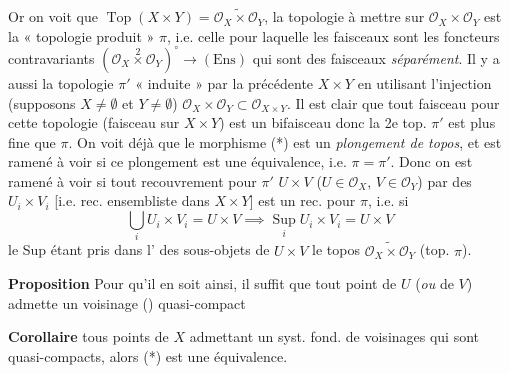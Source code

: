 \documentclass[11pt,a4paper]{article}
\begin{document}

Or on voit que $\operatorname{Top}(X \times Y) = \widetilde{\mathcal{O}_{X}
\times \mathcal{O}_{Y}}$,  la topologie à mettre sur
$\mathcal{O}_{X} \times \mathcal{O}_{Y}$ est la « topologie produit » $\pi$,
i.e. celle pour laquelle les faisceaux sont les foncteurs contravariants
$(\mathcal{O}_{X} \overset{2}{\times} \mathcal{O}_{Y})^{\circ} \to
(\mathrm{Ens})$ qui sont des faisceaux \emph{séparément}.  Il y a
aussi la topologie $\pi'$ \struck{\ill{}} « induite » par la précédente
$X \times Y$ en utilisant l'injection (supposons $X \neq \emptyset$ et
$Y \neq \emptyset$) $\mathcal{O}_{X} \times \mathcal{O}_{Y} \subset
\mathcal{O}_{X \times Y}$. Il est clair que tout faisceau pour cette topologie
(faisceau sur $X \times Y$) est un bifaisceau \struck{\ill{}} donc la 2e top.
$\pi'$ est plus fine que $\pi$. On voit déjà que \struck{\ill{}} le
morphisme (*) est un \emph{plongement de topos}, et \struck{\ill{}} est ramené
à voir si ce plongement est une équivalence, i.e. $\pi = \pi'$. Donc on est
ramené à voir si tout recouvrement pour $\pi'$ $U \times V$
($U \in \mathcal{O}_{X}$, $V \in \mathcal{O}_{Y}$) par des $U_{i} \times V_{i}$
[i.e. rec. ensembliste dans $X \times Y$] est un rec. pour $\pi$, i.e.
 si
\[
\bigcup_{i} U_{i} \times V_{i} = U \times V \implies
\operatorname*{Sup}_{i} U_{i} \times V_{i} = U \times V
\]
le Sup étant pris dans l' des sous-objets de
$U \times V$  le topos $\widetilde{\mathcal{O}_{X} \times
\mathcal{O}_{Y}}$ (top. $\pi$).

\textbf{Proposition} Pour qu'il en soit ainsi, il suffit que tout
\struck{\ill{}} point de $U$ (\emph{ou} de $V$) admette un voisinage ()
quasi-compact

\textbf{Corollaire}  tous points de $X$  admettant un
syst. fond. de voisinages qui sont quasi-compacts, alors (*) est une
équivalence.



\end{document}
